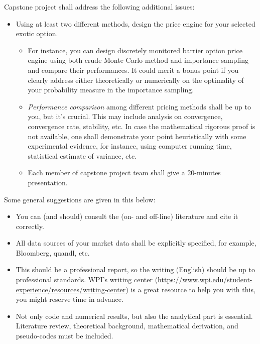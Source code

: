\documentclass{article}
\begin{document}
Capstone project shall address the following additional issues:
\begin{itemize}
 
\item Using at least two different methods, 
design the price engine for your selected exotic option. 
\begin{itemize}
 \item  For instance, you can design discretely monitored 
barrier option price engine using both crude Monte Carlo method 
and  importance sampling and compare their performances. 
It could merit a bonus point if you clearly address either theoretically or 
numerically on the optimality of your probability measure in the importance sampling.
\item {\it Performance comparison} among different pricing methods shall be up to you, but it's crucial.
This may include analysis on convergence, convergence rate, stability, etc. 
In case the mathematical rigorous proof is not available, 
 one shall demonstrate your point heuristically with some experimental evidence, 
 for instance, using computer running time, statistical estimate of variance, etc.

\item Each member of capstone project team shall give a 20-minutes presentation.
\end{itemize}

\end{itemize}


Some general suggestions are given in this below:
\begin{itemize}

\item You can (and should)  consult the (on- and off-line) literature and cite it correctly.

\item All data sources of your market data shall be explicitly specified, for example, 
Bloomberg,  quandl, etc.

\item This should be a professional report, so the writing (English) should be up to professional standards. WPI's writing center (\url{https://www.wpi.edu/student-experience/resources/writing-center}) is a great resource to help you with this, you might reserve time in advance. 

\item
Not only code and numerical results, but also the analytical part is essential.
Literature review, theoretical background, 
mathematical derivation, and pseudo-codes must be included. 

\end{itemize}
\end{document}
